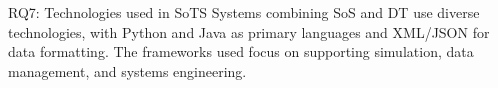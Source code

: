 \begin{conclusionframe}{RQ7: Technologies used in SoTS}
Systems combining SoS and DT use diverse technologies, with Python and Java as primary languages and XML/JSON for data formatting. The frameworks used focus on supporting simulation, data management, and systems engineering.
\end{conclusionframe}